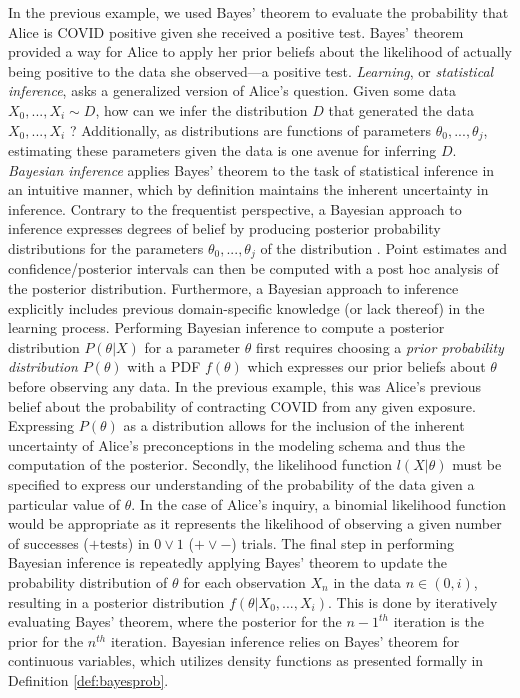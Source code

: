 \documentclass[
  12pt,
]{book}
\theoremstyle{definition}
\theoremstyle{definition}
\theoremstyle{definition}
\theoremstyle{remark}
\begin{document}
In the previous example, we used Bayes' theorem to evaluate the probability that Alice is COVID positive given she received a positive test.
Bayes' theorem provided a way for Alice to apply her prior beliefs about the likelihood of actually being positive to the data she observed---a positive test.
\emph{Learning}, or \emph{statistical inference}, asks a generalized version of Alice's question.
Given some data \(X_0,...,X_i \sim D\), how can we infer the distribution \(D\) that generated the data \(X_0,...,X_i\) \citep[  6.1]{Wasserman2004}?
Additionally, as distributions are functions of parameters \(\theta_0, ..., \theta_j\), estimating these parameters given the data is one avenue for inferring \(D\).
\emph{Bayesian inference} applies Bayes' theorem to the task of statistical inference in an intuitive manner, which by definition maintains the inherent uncertainty in inference.
Contrary to the frequentist perspective, a Bayesian approach to inference expresses degrees of belief by producing posterior probability distributions for the parameters \(\theta_0, ..., \theta_j\) of the distribution \citep[  11.1]{Wasserman2004}.
Point estimates and confidence/posterior intervals can then be computed with a post hoc analysis of the posterior distribution.
Furthermore, a Bayesian approach to inference explicitly includes previous domain-specific knowledge (or lack thereof) in the learning process.
Performing Bayesian inference to compute a posterior distribution \(P(\theta|X)\) for a parameter \(\theta\) first requires choosing a \emph{prior probability distribution} \(P(\theta)\) with a PDF \(f(\theta)\) which expresses our prior beliefs about \(\theta\) before observing any data.
In the previous example, this was Alice's previous belief about the probability of contracting COVID from any given exposure.
Expressing \(P(\theta)\) as a distribution allows for the inclusion of the inherent uncertainty of Alice's preconceptions in the modeling schema and thus the computation of the posterior.
Secondly, the likelihood function \(l(X|\theta)\) must be specified to express our understanding of the probability of the data given a particular value of \(\theta\).
In the case of Alice's inquiry, a binomial likelihood function would be appropriate as it represents the likelihood of observing a given number of successes (\(+\)tests) in \(0 \lor 1\) (\(+ \lor -\)) trials.
The final step in performing Bayesian inference is repeatedly applying Bayes' theorem to update the probability distribution of \(\theta\) for each observation \(X_n\) in the data \(n \in (0,i)\), resulting in a posterior distribution \(f(\theta|X_0,...,X_i)\).
This is done by iteratively evaluating Bayes' theorem, where the posterior for the \(n-1^{th}\) iteration is the prior for the \(n^{th}\) iteration.
Bayesian inference relies on Bayes' theorem for continuous variables, which utilizes density functions as presented formally in Definition \ref{def:bayesprob}.
\end{document}
